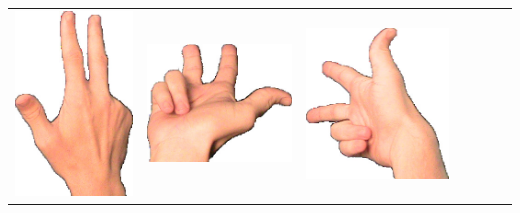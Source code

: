 \documentclass{article}
\begin{document}
\begin{center}
\begin{tabular}{r*{6}{c}}
\includegraphics[scale=0.1]{images/03-01-3.jpg}&
\includegraphics[scale=0.1]{images/03-01-4.jpg}&
\includegraphics[scale=0.1]{images/03-01-5.jpg}&

\end{tabular}
\end{center}
\end{document}
